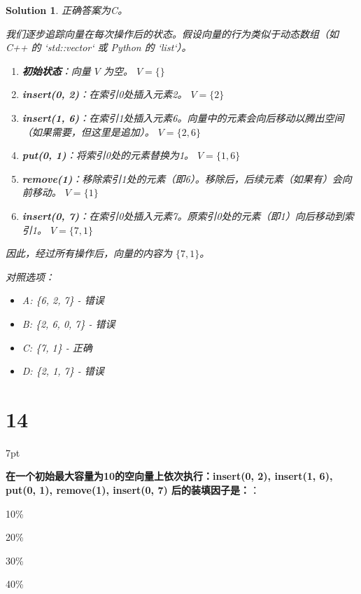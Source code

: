 \documentclass[UTF8]{report}
\newtheorem{solution}{Solution}
\theoremstyle{MyLineTheoremStyle} %
\theoremstyle{MyBlockTheoremStyle} %
\theoremstyle{MySubsubsectionStyle} %
\newenvironment{graybox}{%
        \def\FrameCommand{%
        \hspace{1pt}%
        {\color{gray}\small \vrule width 2pt}%
        {\color{graybox_color}\vrule width 4pt}%
        \colorbox{graybox_color}%
        }%
        \MakeFramed{\advance\hsize-\width\FrameRestore}%
        \noindent\hspace{-4.55pt}%
        \begin{adjustwidth}{}{7pt}%
        \vspace{2pt}\vspace{2pt}%
        }
        {%
        \vspace{2pt}\end{adjustwidth}\endMakeFramed%
        }
\begin{document}
\begin{solution}
正确答案为C。

我们逐步追踪向量在每次操作后的状态。假设向量的行为类似于动态数组（如 C++ 的 `std::vector` 或 Python 的 `list`）。

\begin{enumerate}
    \item \textbf{初始状态}：向量 $V$ 为空。
    $V = \{\}$

    \item \textbf{insert(0, 2)}：在索引0处插入元素2。
    $V = \{2\}$

    \item \textbf{insert(1, 6)}：在索引1处插入元素6。向量中的元素会向后移动以腾出空间（如果需要，但这里是追加）。
    $V = \{2, 6\}$

    \item \textbf{put(0, 1)}：将索引0处的元素替换为1。
    $V = \{1, 6\}$

    \item \textbf{remove(1)}：移除索引1处的元素（即6）。移除后，后续元素（如果有）会向前移动。
    $V = \{1\}$

    \item \textbf{insert(0, 7)}：在索引0处插入元素7。原索引0处的元素（即1）向后移动到索引1。
    $V = \{7, 1\}$
\end{enumerate}

因此，经过所有操作后，向量的内容为 $\{7, 1\}$。

对照选项：
\begin{itemize}
    \item A: \{6, 2, 7\} - 错误
    \item B: \{2, 6, 0, 7\} - 错误
    \item C: \{7, 1\} - 正确
    \item D: \{2, 1, 7\} - 错误
\end{itemize}
\end{solution}

\section*{14}

\begin{graybox}
\textbf{在一个初始最大容量为10的空向量上依次执行：insert(0, 2), insert(1, 6), put(0, 1), remove(1), insert(0, 7) 后的装填因子是：}：
\begin{circledenum}
    \item 10\%
    \item 20\%
    \item 30\%
    \item 40\%
\end{circledenum}
\end{graybox}
\end{document}
